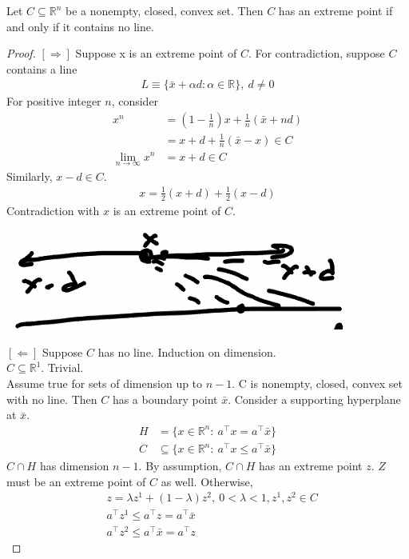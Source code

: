 \documentclass[11pt]{article}
\numberwithin{equation}{section}
\begin{document}
\begin{theorem}
    Let $C \subseteq \mathbb{R}^n$ be a nonempty, closed, convex set. Then $C$ has an extreme point if and only if it contains no line.
    \begin{proof}
        $[\Longrightarrow]$ Suppose x is an extreme point of $C$. For contradiction, suppose $C$ contains a line \begin{align*}
            L \equiv \{\bar{x}+\alpha d:\alpha \in \mathbb{R}\}, \ d \neq 0
        \end{align*} For positive integer $n$, consider
        \begin{align*}
            x^n &= (1-\frac{1}{n})x + \frac{1}{n}(\bar{x}+nd) \\
            &= x+d+\frac{1}{n}(\bar{x}-x) \in C\\
            \lim_{n\to\infty}x^n&=x+d \in C
        \end{align*}
        Similarly, $x-d \in C$. \begin{align*}
            x=\frac{1}{2}(x+d)+\frac{1}{2}(x-d)
        \end{align*} Contradiction with $x$ is an extreme point of $C$.

        \begin{center}
            \includegraphics[scale = 0.5]{images/4-pr-1.png}
        \end{center}

        $[\Longleftarrow]$ Suppose $C$ has no line. Induction on dimension.\\
        $C \subseteq \mathbb{R}^1$. Trivial.\\
        Assume true for sets of dimension up to $n-1$. C is nonempty, closed, convex set with no line.
        Then $C$ has a boundary point $\bar{x}$. Consider a supporting hyperplane at $\bar{x}$.
        \begin{align*}
            H &=\{ x \in \mathbb{R}^n:\ a^\top x=a^\top  \bar{x} \}\\
            C &\subseteq \{ x \in \mathbb{R}^n:\ a^\top x \leq a^\top  \bar{x} \}
        \end{align*}
        $C \cap H$ has dimension $n-1$. By assumption, $C \cap H$ has an extreme point $z$. $Z$ must be an extreme point of $C$ as well.
        Otherwise,\begin{align*}
            &z=\lambda z^1 +(1-\lambda)z^2, \ 0<\lambda<1, z^1,z^2 \in C \\
            &a^{\top} z^{1} \leq a^{\top}z=a^{\top} \bar{x} \\
            &a^{\top} z^{2} \leq a^{\top}\bar{x}=a^{\top} z
        \end{align*}


\end{proof}
\end{theorem}
\end{document}

